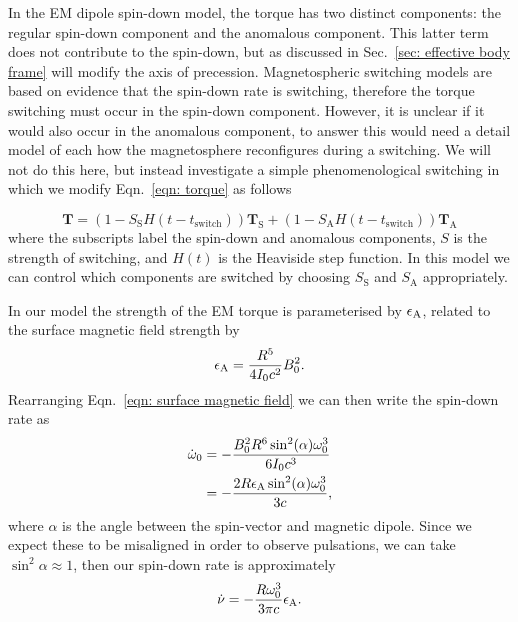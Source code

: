 \documentclass[../full_thesis/full_thesis.tex]{subfiles}
\begin{document}
In the EM dipole spin-down model, the torque has two distinct components: the
regular spin-down component and the anomalous component. This latter term
does not contribute to the spin-down, but as discussed in Sec.~\ref{sec: effective
body frame} will modify the axis of precession. Magnetospheric switching models
are based on evidence that the spin-down rate is switching, therefore the torque
switching must occur in the spin-down component. However, it is unclear if it would
also occur in the anomalous component, to answer this would need a detail model
of each how the magnetosphere reconfigures during a switching. We will not do
this here, but instead investigate a simple phenomenological switching in which we
modify Eqn.~\eqref{eqn: torque} as follows
\newcommand{\Ss}{S_{\mathrm{S}}}
\newcommand{\Sa}{S_{\mathrm{A}}}

\begin{equation}
\mathbf{T} = (1 - \Ss H(t-t_{\mathrm{switch}})) \mathbf{T}_{\mathrm{S}}+
                 (1 - \Sa H(t-t_{\mathrm{switch}})) \mathbf{T}_{\mathrm{A}}
\label{eqn: single switch torque}
\end{equation}
where the subscripts label the spin-down and anomalous components, $S$ is the
strength of switching, and $H(t)$ is the Heaviside step function. In this model
we can control which components are switched by choosing $\Ss$ and $\Sa$
appropriately.

In our model the strength of the EM torque is parameterised
by $\epsilon_{\mathrm{A}}$, related to the surface magnetic field strength by
\begin{align}
    \epsilon_{\mathrm{A}} = \frac{R^{5}}{4I_{0} c^{2}} B_{0}^{2}.
\end{align}
Rearranging Eqn.~\eqref{eqn: surface magnetic field} we can then write the
spin-down rate as
\begin{align}
    \dot{\omega}_{0} & = -\frac{B_{0}^{2}R^{6} \sin^{2}(\alpha) \omega_{0}^{3}}{6 I_{0} c^{3}} \\
    & = - \frac{2 R \epsilon_{\mathrm{A}} \sin^{2}(\alpha) \omega_{0}^{3}}{3 c},
\end{align}
where $\alpha$ is the angle between the spin-vector and magnetic dipole. Since
we expect these to be misaligned in order to observe pulsations, we can take
$\sin^{2}\alpha \approx 1$, then our spin-down rate is approximately
\begin{equation}
    \dot{\nu} = - \frac{R\omega_{0}^{3}}{3\pi c}\epsilon_{\mathrm{A}}.
    \label{eqn: spin-down of epsA}
\end{equation}
\end{document}
